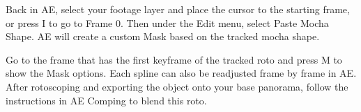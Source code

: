 \begin{fullwidth}


Back in AE, select your footage layer and place the cursor to the starting frame, or press I to go to Frame 0. Then under the Edit menu, select Paste Mocha Shape. AE will create a custom Mask based on the tracked mocha shape. 


Go to the frame that has the first keyframe of the tracked roto and press M to show the Mask options. Each spline can also be readjusted frame by frame in AE. After rotoscoping and exporting the object onto your base panorama, follow the instructions in AE Comping to blend this roto.


\clearpage
\end{fullwidth}